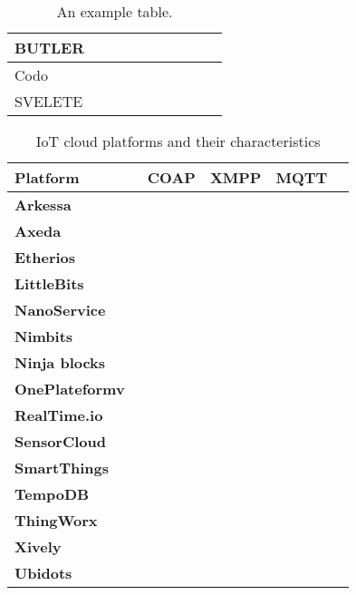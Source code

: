 \begin{table}[h!]
\begin{tabulary}{\textwidth}{L|C|C|C|C|C|C|C|C|C}
	BUTLER          &              &              &             &          &             &            &             &                  &         \\\hline
	Codo            &              &              &             &          &             &            &             &                  &         \\\hline
	SVELETE         &              &              &             &          &             &            &             &                  &         \\\hline
		\end{tabulary}
	\caption{\label{tab:Table54975} An example table.}
\end{table}


\begin{table}[h!]
\scriptsize
	\begin{tabulary}{\textwidth}{L|C|C|C|C}
	\bf{Platform}      & \ \bf{COAP} & \bf{XMPP} & \bf{MQTT}\\\hline
	\bf{Arkessa}       &             &           & \ok      \\\hline
	\bf{Axeda}         &             &           &          \\\hline
	\bf{Etherios}      &             &           &          \\\hline
	\bf{LittleBits}    &             &           &          \\\hline
	\bf{NanoService}   & \ok         &           &          \\\hline
	\bf{Nimbits}       &             & \ok       &          \\\hline
	\bf{Ninja blocks}  &             &           &          \\\hline
	\bf{OnePlateformv} & \ok         & \ok       &          \\\hline
	\bf{RealTime.io}   &             &           &          \\\hline
	\bf{SensorCloud}   &             &           &          \\\hline
	\bf{SmartThings}   &             &           &          \\\hline
	\bf{TempoDB}       &             &           &          \\\hline
	\bf{ThingWorx}     &             &           & \ok      \\\hline
	\bf{Xively}        &             &           & \ok      \\\hline
	\bf{Ubidots}       &             &           & \ok      \\\hline
	\end{tabulary}
	\caption{\label{tab:IoTPlatforms} IoT cloud platforms and their characteristics}
\end{table}



